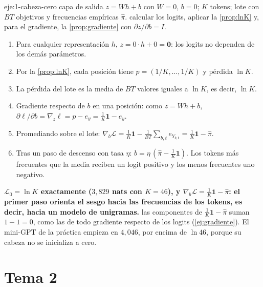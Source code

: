 \begin{solucion}{eje:1-cabeza-cero}
\datos capa de salida $z=Wh+b$ con $W=0$, $b=0$; $K$ tokens; lote con $BT$ objetivos y frecuencias empíricas $\hat\pi$.
\planteamiento calcular los logits, aplicar la \cref{prop:lnK} y, para el gradiente, la \cref{prop:gradiente} con $\partial z/\partial b=I$.
\pasos
\begin{enumerate}[label=\arabic*.]
  \item Para cualquier representación $h$, $z=0\cdot h+0=\mathbf 0$: los logits no dependen de los demás parámetros.
  \item Por la \cref{prop:lnK}, cada posición tiene $p=(1/K,\dots,1/K)$ y pérdida $\ln K$.
  \item La pérdida del lote es la media de $BT$ valores iguales a $\ln K$, es decir, $\ln K$.
  \item Gradiente respecto de $b$ en una posición: como $z=Wh+b$, $\partial\ell/\partial b=\nabla_z\ell=p-e_y=\tfrac1K\mathbf 1-e_y$.
  \item Promediando sobre el lote: $\nabla_b\mathcal{L}=\tfrac1K\mathbf 1-\frac{1}{BT}\sum_{b,t}e_{Y_{b,t}}=\tfrac1K\mathbf 1-\hat\pi$.
  \item Tras un paso de descenso con tasa $\eta$: $b=\eta\,(\hat\pi-\tfrac1K\mathbf 1)$. Los tokens más frecuentes que la media reciben un logit positivo y los menos frecuentes uno negativo.
\end{enumerate}
\resultado \textbf{$\mathcal{L}_0=\ln K$ exactamente ($3{,}829$ nats con $K=46$), y $\nabla_b\mathcal{L}=\tfrac1K\mathbf 1-\hat\pi$: el primer paso orienta el sesgo hacia las frecuencias de los tokens, es decir, hacia un modelo de unigramas.}
\comprobacion las componentes de $\tfrac1K\mathbf 1-\hat\pi$ suman $1-1=0$, como las de todo gradiente respecto de los logits (\cref{ej:gradiente}). El mini-GPT de la práctica empieza en $4{,}046$, por encima de $\ln 46$, porque su cabeza no se inicializa a cero.
\end{solucion}

\section{Tema 2}

